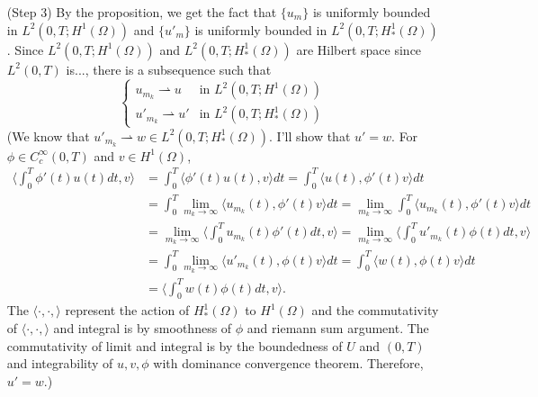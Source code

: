\documentclass{article}
\newtheorem{proposition}{Proposition}
\begin{document}
\begin{enumerate}
For now, I'll accept the proposition:
\begin{proposition}
For each $u_m$ satisfies
\begin{equation*}
\max_{t\in [0,T]}\norm{u_m(t)}_{L^2(\Omega)}+\norm{u_m(t)}_{L^2(0, t;H^1(\Omega))}+\norm{u'_m}_{L^2(0,T;H	_*^1(\Omega))}\leq C\left(\norm{f}_{L^2(0,T;L^2(\Omega))}+\norm{g}_{L^2(\Omega)}\right)
\end{equation*}
for some constant $C$ depending only on $\Omega,T$.
\end{proposition}
\item[(Step 3)]
By the proposition, we get the fact that $\{u_m\}$ is uniformly bounded in $L^2(0,T;H^1(\Omega))$ and $\{u'_m\}$ is uniformly bounded in $L^2(0,T;H	_*^1(\Omega))$. Since $L^2(0,T;H^1(\Omega))$ and $L^2(0,T;H	_*^1(\Omega))$ are Hilbert space since $L^2(0,T)$ is..., there is a subsequence such that
\begin{equation*}
\begin{cases}
u_{m_k}\rightharpoonup u & \text{in }L^2(0,T;H^1(\Omega)) \\
u'_{m_k}\rightharpoonup u' & \text{in }L^2(0,T;H	_*^1(\Omega))
\end{cases}
\end{equation*}
(We know that $u'_{m_k}\rightharpoonup w\in L^2(0,T;H	_*^1(\Omega))$. I'll show that $u'=w$. For $\phi\in C^\infty_c(0,T)$ and $v\in H^1(\Omega)$,
\begin{equation*}
\begin{split}
\langle \int_0^T \phi'(t)u(t) dt,v\rangle&=\int_0^T  \langle \phi'(t)u(t), v\rangle dt =\int_0^T  \langle u(t), \phi'(t)v\rangle dt\\
&=\int_0^T  \lim\limits_{m_k\rightarrow\infty}\langle u_{m_k}(t), \phi'(t)v\rangle dt =\lim\limits_{m_k\rightarrow\infty}\int_0^T \langle u_{m_k}(t), \phi'(t)v\rangle dt \\
&=\lim\limits_{m_k\rightarrow\infty}\langle\int_0^T  u_{m_k}(t)\phi'(t) dt, v\rangle =\lim\limits_{m_k\rightarrow\infty}\langle\int_0^T  u'_{m_k}(t)\phi(t) dt, v\rangle \\
&=\int_0^T  \lim\limits_{m_k\rightarrow\infty}\langle u'_{m_k}(t), \phi(t)v\rangle dt =\int_0^T \langle w(t), \phi(t)v\rangle dt \\
&=\langle\int_0^T  w(t)\phi(t) dt, v\rangle.
\end{split}
\end{equation*}
The $\langle\cdot,\cdot,\rangle$ represent the action of $H^1_*(\Omega)$ to $H^1(\Omega)$ and the commutativity of $\langle\cdot,\cdot,\rangle$ and integral is by smoothness of $\phi$ and riemann sum argument. The commutativity of limit and integral is by the boundedness of $U$ and $(0,T)$ and integrability of $u,v,\phi$ with dominance convergence theorem. Therefore, $u'=w$.)


\end{enumerate}
\end{document}
